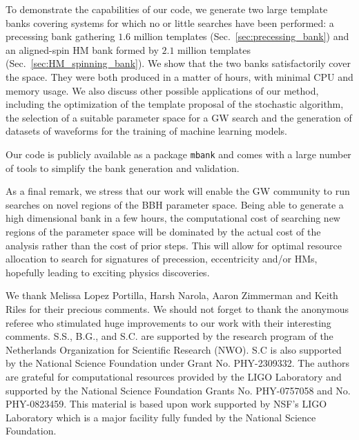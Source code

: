 \documentclass[twocolumn,showpacs,preprintnumbers,nofootinbib,prd,
superscriptaddress,10pt]{revtex4-2}
\begin{document}
To demonstrate the capabilities of our code, we generate two large template banks covering systems for which no or little searches have been performed: a precessing bank gathering $1.6$ million templates (Sec.~\ref{sec:precessing_bank}) and an aligned-spin HM bank formed by $2.1$ million templates (Sec.~\ref{sec:HM_spinning_bank}). We show that the two banks satisfactorily cover the space. They were both produced in a matter of hours, with minimal CPU and memory usage.
We also discuss other possible applications of our method, including the optimization of the template proposal of the stochastic algorithm, the selection of a suitable parameter space for a GW search and the generation of datasets of waveforms for the training of machine learning models.

Our code is publicly available as a package \texttt{mbank}\cite{mbank} and comes with a large number of tools to simplify the bank generation and validation.

As a final remark, we stress that our work will enable the GW community to run searches on novel regions of the BBH parameter space. Being able to generate a high dimensional bank in a few hours, the computational cost of searching new regions of the parameter space will be dominated by the actual cost of the analysis rather than the cost of prior steps.
This will allow for optimal resource allocation to search for signatures of precession, eccentricity and/or HMs, hopefully leading to exciting physics discoveries.


        \begin{acknowledgments}
		We thank Melissa Lopez Portilla, Harsh Narola, Aaron Zimmerman and Keith Riles for their precious comments. We should not forget to thank the anonymous referee who stimulated huge improvements to our work with their interesting comments.
		S.S., B.G., and S.C. are supported by the research program of the Netherlands Organization for Scientific Research (NWO). S.C is also supported by the National Science Foundation under Grant No. PHY-2309332.
		The authors are grateful for computational resources provided by the LIGO Laboratory and supported by the National Science Foundation Grants No. PHY-0757058 and No. PHY-0823459. This material is based upon work supported by NSF’s LIGO Laboratory which is a major facility fully funded by the National Science Foundation.
        \end{acknowledgments}

\appendix
\end{document}
